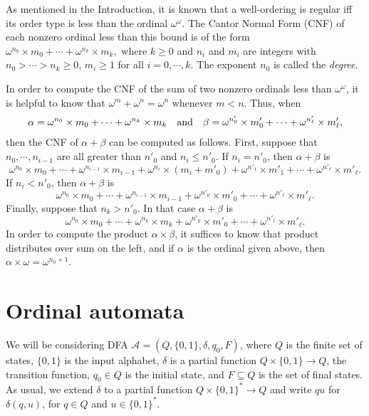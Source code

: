 \documentclass[copyright]{eptcs}
\newcommand{\cA}{\mathcal{A}}
\newcommand{\zo}{\{0,1\}}
\newcommand{\zos}{\{0,1\}^*}
\begin{document}
As mentioned in the Introduction, it is known that a well-ordering 
is regular iff its order type is less than the ordinal $\omega^\omega$.
The Cantor Normal Form (CNF) \cite{Rosenstein} 
of each nonzero ordinal less than this bound is of the form
$
\omega^{n_0}\times m_0 + \cdots + \omega^{n_k}\times m_k,
$
where $k \geq 0$ and $n_i$ and $m_i$ are integers with  
$n_0 > \cdots > n_k \geq 0$, $m_i \geq 1$ for all $i = 0,\cdots,k$. The 
exponent $n_0$ is called the \emph{degree}.  

In order to compute the CNF of the 
sum of two nonzero ordinals less than $\omega^\omega$, it is helpful to know 
that $\omega^m +\omega^n = \omega^n$ whenever $m < n$. 
Thus, when 
\begin{eqnarray*}
\alpha = \omega^{n_0}\times m_0 + \cdots + \omega^{n_k}\times m_k
\quad {\rm and}\quad 
\beta =  \omega^{n'_0}\times m'_0 + \cdots + \omega^{n'_\ell}\times m'_\ell,
\end{eqnarray*}
then the CNF of $\alpha + \beta$ can be computed as follows. 
First, suppose that $n_0,\cdots,n_{i-1}$ are all greater than $n'_0$
and $n_{i} \leq n'_0$. If $n_i = n'_0$, then $\alpha + \beta$
is
$$\omega^{n_0}\times m_0 + \cdots + \omega^{n_{i-1}}\times m_{i-1} 
+ \omega^{n_i}\times (m_i + m'_0) +
 \omega^{n'_1}\times m'_1 + \cdots + \omega^{n'_\ell}\times m'_\ell.$$
If $n_i < n'_0$, then $\alpha + \beta$ is
$$
\omega^{n_0}\times m_0 + \cdots + \omega^{n_{i-1}}\times m_{i-1}
+  \omega^{n'_0}\times m'_0 + \cdots + \omega^{n'_\ell}\times m'_\ell.
$$
Finally, suppose that $n_k > n'_0$. In that case $\alpha + \beta$ is 
$$
\omega^{n_0}\times m_0 + \cdots + \omega^{n_k}\times m_k + 
 \omega^{n'_0}\times m'_0 + \cdots + \omega^{n'_\ell}\times m'_\ell.
$$
In order to compute the product $\alpha \times \beta$, it suffices to know 
that product distributes over sum on the left, and if $\alpha$ is 
the ordinal given above, then $\alpha \times \omega = \omega^{n_0 +1}$. 

 










\section{Ordinal automata}

We will be considering DFA $\cA = (Q,\zo,\delta,q_0,F)$,
where $Q$ is the finite set of states, $\zo$ is the
input alphabet, $\delta$ is a partial function
$Q \times \zo \to Q$, the transition function,
$q_0\in Q$ is the initial state, and $F \subseteq Q$ 
is the set of final states. As usual, we extend $\delta$ 
to a partial function $Q \times \zos \to Q$ 
and write $qu$ for $\delta(q,u)$, for $q \in Q$ and
$u \in \zos$.
\end{document}
